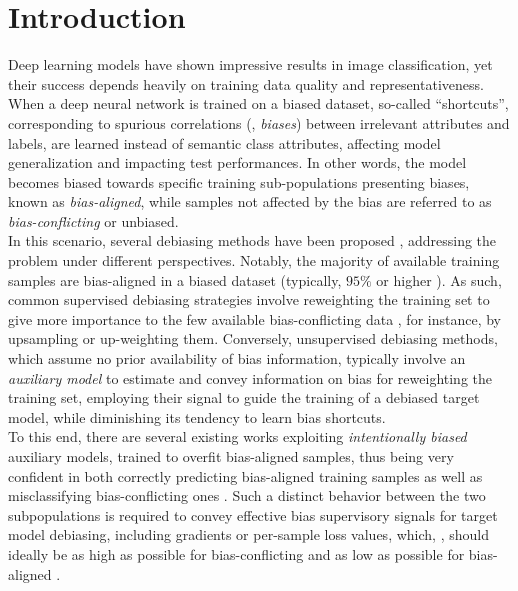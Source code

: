 \section{Introduction}
\label{sec:intro}
Deep learning models have shown impressive results in image classification, yet their success depends heavily on training data quality and representativeness. When a deep neural network is trained on a biased dataset, so-called ``shortcuts'', corresponding to spurious correlations (\ie, \textit{biases}) between irrelevant attributes and labels, are learned instead of semantic class attributes, affecting model generalization and impacting test performances. In other words, the model becomes biased towards specific training sub-populations presenting biases, known as \textit{bias-aligned}, while samples not affected by the bias are referred to as \textit{bias-conflicting} or unbiased. 
\\
In this scenario, several debiasing methods have been proposed \cite{NEURIPS2022_75004615_LWBC, tartaglione2023disentangling, pastore2024lookingmodeldebiasinglens, kim2021biaswap, Lee_Park_Kim_Lee_Choi_Choo_2023}, addressing the problem under different perspectives.
Notably, the majority of available training samples are bias-aligned in a biased dataset (typically, $95\%$ or higher \cite{nam2020learning}). As such, common supervised debiasing strategies involve reweighting the training set to give more importance to the few available bias-conflicting data \cite{Lee_Park_Kim_Lee_Choi_Choo_2023}, for instance, by upsampling \cite{li2019repair} or up-weighting \cite{Sagawa*2020Distributionally} them. Conversely, unsupervised debiasing methods, which assume no prior availability of bias information, typically involve an \textit{auxiliary model} to estimate and convey information on bias for reweighting the training set, employing their signal to guide the training of a debiased target model, while diminishing its tendency to learn bias shortcuts. 
\\To this end, there are several existing works \cite{nam2020learning, NEURIPS2022_75004615_LWBC, Lee_Park_Kim_Lee_Choi_Choo_2023, sohoni2020no} exploiting \textit{intentionally biased} auxiliary models, trained to overfit bias-aligned samples, thus being very confident in both correctly predicting bias-aligned training samples as well as misclassifying bias-conflicting ones \cite{Lee_Park_Kim_Lee_Choi_Choo_2023}. Such a distinct behavior between the two subpopulations is required to convey effective bias supervisory signals for target model debiasing, including gradients or per-sample loss values, which, \eg, should ideally be as high as possible for bias-conflicting and as low as possible for bias-aligned \cite{nam2020learning}.
